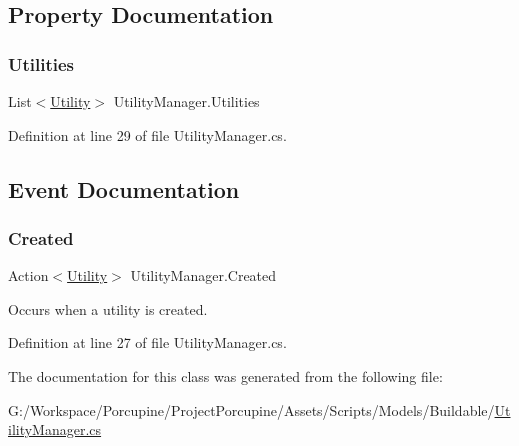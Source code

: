 \subsection{Property Documentation}
\mbox{\label{class_utility_manager_af4625dbf9e27a0eb4a3e7b30b40e450a}} 
\subsubsection{\texorpdfstring{Utilities}{Utilities}}
{\footnotesize\ttfamily List$<$\hyperlink{class_utility}{Utility}$>$ Utility\+Manager.\+Utilities\hspace{0.3cm}{\ttfamily [get]}}



Definition at line 29 of file Utility\+Manager.\+cs.



\subsection{Event Documentation}
\mbox{\label{class_utility_manager_a7f706d46fe0abd5992aac32fc2fd80e2}} 
\subsubsection{\texorpdfstring{Created}{Created}}
{\footnotesize\ttfamily Action$<$\hyperlink{class_utility}{Utility}$>$ Utility\+Manager.\+Created}



Occurs when a utility is created. 



Definition at line 27 of file Utility\+Manager.\+cs.



The documentation for this class was generated from the following file\+:\begin{DoxyCompactItemize}
\item 
G\+:/\+Workspace/\+Porcupine/\+Project\+Porcupine/\+Assets/\+Scripts/\+Models/\+Buildable/\hyperlink{_utility_manager_8cs}{Utility\+Manager.\+cs}\end{DoxyCompactItemize}
